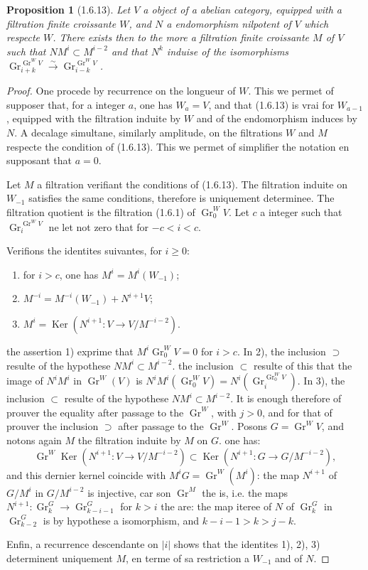 \documentclass[12pt,a4paper]{article}
\theoremstyle{plain}
\newtheorem{proposition}[theorem]{Proposition}
\theoremstyle{definition}
\theoremstyle{definition}
\theoremstyle{remark}
\DeclareMathOperator{\Gr}{Gr}
\DeclareMathOperator{\Ker}{Ker}
\begin{document}
\begin{proposition}[1.6.13]
Let $V$ a object of a abelian category, equipped with a filtration finite croissante $W$, and $N$ a endomorphism nilpotent of $V$ which respecte $W$. There exists then to the more a filtration finite croissante $M$ of $V$ such that $NM^i \subset M^{i-2}$ and that $N^k$ induise of the isomorphisms $\Gr_{i+k}^{\Gr^W V} \xrightarrow{\sim} \Gr_{i-k}^{\Gr^W V}$.
\end{proposition}

\begin{proof}
One procede by recurrence on the longueur of $W$. This we permet of supposer that, for a integer $a$, one has $W_a = V$, and that (1.6.13) is vrai for $W_{a-1}$, equipped with the filtration induite by $W$ and of the endomorphism induces by $N$. A decalage simultane, similarly amplitude, on the filtrations $W$ and $M$ respecte the condition of (1.6.13). This we permet of simplifier the notation en supposant that $a = 0$.

Let $M$ a filtration verifiant the conditions of (1.6.13). The filtration induite on $W_{-1}$ satisfies the same conditions, therefore is uniquement determinee. The filtration quotient is the filtration (1.6.1) of $\Gr_0^W V$. Let $c$ a integer such that $\Gr_i^{\Gr^W V}$ ne let not zero that for $-c < i < c$.

Verifions the identites suivantes, for $i \geq 0$:
\begin{enumerate}[nosep]
\item[1)] for $i > c$, one has $M^i = M^i(W_{-1})$;
\item[2)] $M^{-i} = M^{-i}(W_{-1}) + N^{i+1}V$;
\item[3)] $M^i = \Ker(N^{i+1}: V \to V/M^{-i-2})$.
\end{enumerate}
the assertion 1) exprime that $M^i \Gr_0^W V = 0$ for $i > c$. In 2), the inclusion $\supset$ resulte of the hypothese $NM^i \subset M^{i-2}$. the inclusion $\subset$ resulte of this that the image of $N^i M^i$ in $\Gr^W(V)$ is $N^i M^i(\Gr_0^W V) = N^i(\Gr_i^{\Gr_0^W V})$. In 3), the inclusion $\subset$ resulte of the hypothese $NM^i \subset M^{i-2}$. It is enough therefore of prouver the equality after passage to the $\Gr^W$, with $j > 0$, and for that of prouver the inclusion $\supset$ after passage to the $\Gr^W$. Posons $G = \Gr^W V$, and notons again $M$ the filtration induite by $M$ on $G$. one has:
\[\Gr^W \Ker(N^{i+1}: V \to V/M^{-i-2}) \subset \Ker(N^{i+1}: G \to G/M^{-i-2}),\]
and this dernier kernel coincide with $M^i G = \Gr^W(M^i)$: the map $N^{i+1}$ of $G/M^i$ in $G/M^{i-2}$ is injective, car son $\Gr^M$ the is, i.e. the maps $N^{i+1}: \Gr_k^G \to \Gr_{k-i-1}^G$ for $k > i$ the are: the map iteree of $N$ of $\Gr_k^G$ in $\Gr_{k-2}^G$ is by hypothese a isomorphism, and $k - i - 1 > k > j - k$.

Enfin, a recurrence descendante on $|i|$ shows that the identites 1), 2), 3) determinent uniquement $M$, en terme of sa restriction a $W_{-1}$ and of $N$.
\end{proof}
\end{document}
